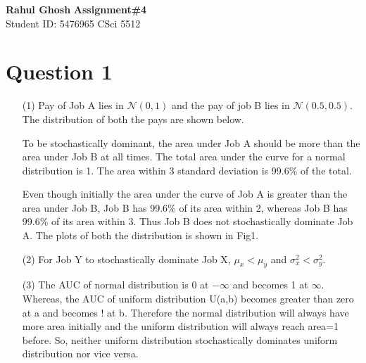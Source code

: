 \documentclass[letter, 10pt]{article}
\begin{document}
\noindent
\large \textbf{Rahul Ghosh} \hfill \textbf{Assignment\#4}\\
\normalsize Student ID: 5476965 \hfill CSci 5512\\

\section*{Question 1}
\begin{itemize}
    \item[(1)] Pay of Job A lies in $\mathcal{N}(0,1)$ and the pay of job B lies in $\mathcal{N}(0.5,0.5)$. The distribution of both the pays are shown below.

    To be stochastically dominant, the area under Job A should be more than the area under Job B at all times. The total area under the curve for a normal distribution is 1. The area within 3 standard deviation is 99.6\% of the total.
    
    Even though initially the area under the curve of Job A is greater than the area under Job B, Job B has 99.6\% of its area within 2, whereas Job B has 99.6\% of its area within 3. Thus Job B does not stochastically dominate Job A. The plots of both the distribution is shown in Fig1.
    
    
    
    \item[(2)] For Job Y to stochastically dominate Job X, $\mu_x<\mu_y$ and $\sigma^2_x<\sigma^2_y$.
    
    \item[(3)] The AUC of normal distribution is 0 at $-\infty$ and becomes 1 at $\infty$. Whereas, the AUC of uniform distribution U(a,b) becomes greater than zero at a and becomes ! at b. Therefore the normal distribution will always have more area initially and the uniform distribution will always reach area=1 before. So, neither uniform distribution stochastically dominates uniform distribution nor vice versa.
\end{itemize}
\end{document}

